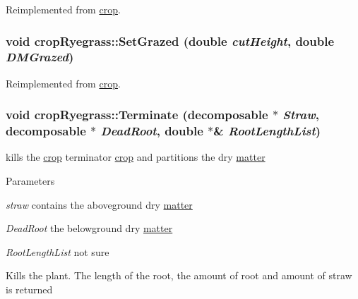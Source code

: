 Reimplemented from \hyperlink{classcrop_ae8be0fd1bc438d926ce68942cb0886a0}{crop}.\hypertarget{classcrop_ryegrass_a64930de42e02d7aa99becc169c5a8b19}{
\subsubsection[{SetGrazed}]{\setlength{\rightskip}{0pt plus 5cm}void cropRyegrass::SetGrazed (double {\em cutHeight}, \/  double {\em DMGrazed})}}
\label{classcrop_ryegrass_a64930de42e02d7aa99becc169c5a8b19}


Reimplemented from \hyperlink{classcrop_a29e704e7767db2f9270128fefc1a74c7}{crop}.\hypertarget{classcrop_ryegrass_a9a97cb45a3f91020ccf85f6fabcc532a}{
\subsubsection[{Terminate}]{\setlength{\rightskip}{0pt plus 5cm}void cropRyegrass::Terminate ({\bf decomposable} $\ast$ {\em Straw}, \/  {\bf decomposable} $\ast$ {\em DeadRoot}, \/  double $\ast$\& {\em RootLengthList})}}
\label{classcrop_ryegrass_a9a97cb45a3f91020ccf85f6fabcc532a}


kills the \hyperlink{classcrop}{crop} terminator \hyperlink{classcrop}{crop} and partitions the dry \hyperlink{classmatter}{matter} 
\begin{DoxyParams}{Parameters}
\item[{\em straw}]contains the aboveground dry \hyperlink{classmatter}{matter} \item[{\em DeadRoot}]the belowground dry \hyperlink{classmatter}{matter} \item[{\em RootLengthList}]not sure\end{DoxyParams}
Kills the plant. The length of the root, the amount of root and amount of straw is returned 

